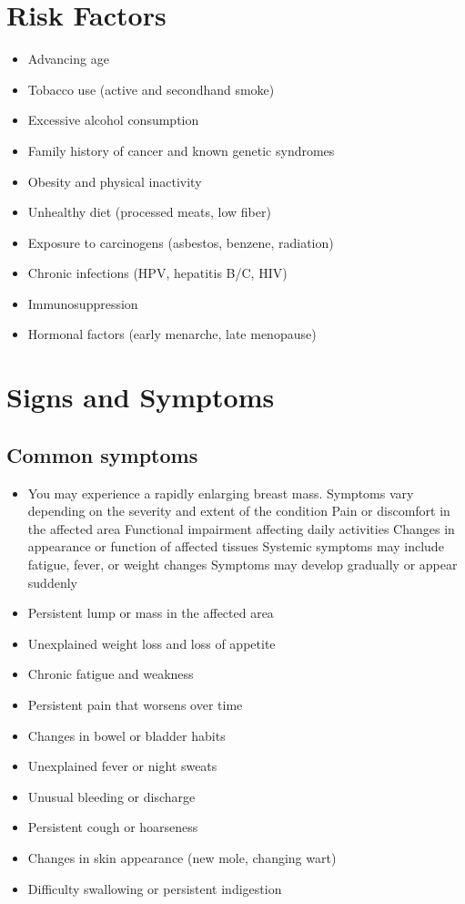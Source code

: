 \section{Risk Factors}


\begin{itemize}[noitemsep]
  \item Advancing age
  \item Tobacco use (active and secondhand smoke)
  \item Excessive alcohol consumption
  \item Family history of cancer and known genetic syndromes
  \item Obesity and physical inactivity
  \item Unhealthy diet (processed meats, low fiber)
  \item Exposure to carcinogens (asbestos, benzene, radiation)
  \item Chronic infections (HPV, hepatitis B/C, HIV)
  \item Immunosuppression
  \item Hormonal factors (early menarche, late menopause)
\end{itemize}
\section{Signs and Symptoms}

\subsection{Common symptoms}
\begin{itemize}[noitemsep]
  \item You may experience a rapidly enlarging breast mass. Symptoms vary depending on the severity and extent of the condition Pain or discomfort in the affected area Functional impairment affecting daily activities Changes in appearance or function of affected tissues Systemic symptoms may include fatigue, fever, or weight changes Symptoms may develop gradually or appear suddenly
  \item Persistent lump or mass in the affected area
  \item Unexplained weight loss and loss of appetite
  \item Chronic fatigue and weakness
  \item Persistent pain that worsens over time
  \item Changes in bowel or bladder habits
  \item Unexplained fever or night sweats
  \item Unusual bleeding or discharge
  \item Persistent cough or hoarseness
  \item Changes in skin appearance (new mole, changing wart)
  \item Difficulty swallowing or persistent indigestion
\end{itemize}

